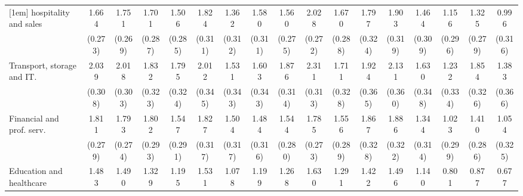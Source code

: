 {\begin{tabular}{l*{16}{c}}
[1em]
hospitality and sales&       1.664\sym{***}&       1.751\sym{***}&       1.701\sym{***}&       1.506\sym{***}&       1.824\sym{***}&       1.362\sym{***}&       1.580\sym{***}&       1.560\sym{***}&       2.028\sym{***}&       1.670\sym{***}&       1.797\sym{***}&       1.903\sym{***}&       1.464\sym{***}&       1.156\sym{***}&       1.325\sym{***}&       0.996\sym{**} \\
                    &     (0.273)         &     (0.269)         &     (0.287)         &     (0.285)         &     (0.311)         &     (0.312)         &     (0.311)         &     (0.275)         &     (0.272)         &     (0.288)         &     (0.324)         &     (0.319)         &     (0.309)         &     (0.296)         &     (0.279)         &     (0.316)         \\
[1em]
Transport, storage and IT.&       2.039\sym{***}&       2.018\sym{***}&       1.832\sym{***}&       1.795\sym{***}&       2.012\sym{***}&       1.531\sym{***}&       1.603\sym{***}&       1.876\sym{***}&       2.311\sym{***}&       1.711\sym{***}&       1.924\sym{***}&       2.131\sym{***}&       1.630\sym{***}&       1.232\sym{***}&       1.854\sym{***}&       1.383\sym{***}\\
                    &     (0.308)         &     (0.303)         &     (0.323)         &     (0.324)         &     (0.345)         &     (0.343)         &     (0.343)         &     (0.314)         &     (0.313)         &     (0.328)         &     (0.365)         &     (0.360)         &     (0.348)         &     (0.334)         &     (0.326)         &     (0.366)         \\
[1em]
Financial and prof. serv.&       1.811\sym{***}&       1.793\sym{***}&       1.802\sym{***}&       1.547\sym{***}&       1.827\sym{***}&       1.504\sym{***}&       1.484\sym{***}&       1.544\sym{***}&       1.785\sym{***}&       1.556\sym{***}&       1.867\sym{***}&       1.886\sym{***}&       1.344\sym{***}&       1.023\sym{***}&       1.410\sym{***}&       1.054\sym{**} \\
                    &     (0.279)         &     (0.274)         &     (0.293)         &     (0.291)         &     (0.317)         &     (0.317)         &     (0.316)         &     (0.280)         &     (0.273)         &     (0.289)         &     (0.328)         &     (0.322)         &     (0.314)         &     (0.299)         &     (0.286)         &     (0.325)         \\
[1em]
Education and healthcare&       1.483\sym{***}&       1.490\sym{***}&       1.329\sym{***}&       1.195\sym{***}&       1.531\sym{***}&       1.078\sym{***}&       1.199\sym{***}&       1.268\sym{***}&       1.630\sym{***}&       1.291\sym{***}&       1.422\sym{***}&       1.496\sym{***}&       1.140\sym{***}&       0.801\sym{**} &       0.877\sym{**} &       0.677\sym{*}  \\

\end{tabular}}
